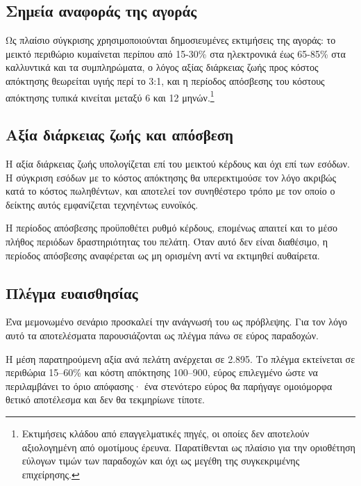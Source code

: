 \subsection{Σημεία αναφοράς της αγοράς}

Ως πλαίσιο σύγκρισης χρησιμοποιούνται δημοσιευμένες εκτιμήσεις της αγοράς: το
μεικτό περιθώριο κυμαίνεται περίπου από 15-30\% στα ηλεκτρονικά έως 65-85\%
στα καλλυντικά και τα συμπληρώματα, ο λόγος αξίας διάρκειας ζωής προς κόστος
απόκτησης θεωρείται υγιής περί το 3:1, και η περίοδος απόσβεσης του κόστους
απόκτησης τυπικά κινείται μεταξύ 6 και 12 μηνών.\footnote{Εκτιμήσεις κλάδου από
επαγγελματικές πηγές, οι οποίες δεν αποτελούν αξιολογημένη από ομοτίμους
έρευνα. Παρατίθενται ως πλαίσιο για την οριοθέτηση εύλογων τιμών των
παραδοχών και όχι ως μεγέθη της συγκεκριμένης επιχείρησης.}

\subsection{Αξία διάρκειας ζωής και απόσβεση}

Η αξία διάρκειας ζωής υπολογίζεται επί του μεικτού κέρδους και όχι επί των
εσόδων. Η σύγκριση εσόδων με το κόστος απόκτησης θα υπερεκτιμούσε τον λόγο
ακριβώς κατά το κόστος πωληθέντων, και αποτελεί τον συνηθέστερο τρόπο με τον
οποίο ο δείκτης αυτός εμφανίζεται τεχνηέντως ευνοϊκός.

Η περίοδος απόσβεσης προϋποθέτει ρυθμό κέρδους, επομένως απαιτεί και το μέσο
πλήθος περιόδων δραστηριότητας του πελάτη. Όταν αυτό δεν είναι διαθέσιμο, η
περίοδος απόσβεσης αναφέρεται ως μη ορισμένη αντί να εκτιμηθεί αυθαίρετα.

\subsection{Πλέγμα ευαισθησίας}

Ένα μεμονωμένο σενάριο προσκαλεί την ανάγνωσή του ως πρόβλεψης. Για τον λόγο
αυτό τα αποτελέσματα παρουσιάζονται ως πλέγμα πάνω σε εύρος παραδοχών.

Η μέση παρατηρούμενη αξία ανά πελάτη ανέρχεται σε 2.895. Το πλέγμα εκτείνεται
σε περιθώρια 15--60\% και κόστη απόκτησης 100--900, εύρος επιλεγμένο ώστε να
περιλαμβάνει το όριο απόφασης· ένα στενότερο εύρος θα παρήγαγε ομοιόμορφα
θετικό αποτέλεσμα και δεν θα τεκμηρίωνε τίποτε.


